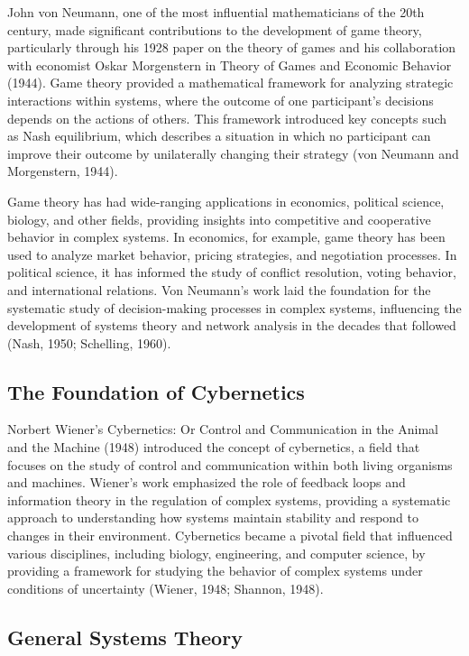 \documentclass[twocolumn]{article}
\begin{document}
\textcolor{primary}{John von Neumann, one of the most influential mathematicians of the 20th century, made significant contributions to the development of game theory, particularly through his 1928 paper on the theory of games and his collaboration with economist Oskar Morgenstern in Theory of Games and Economic Behavior (1944). Game theory provided a mathematical framework for analyzing strategic interactions within systems, where the outcome of one participant’s decisions depends on the actions of others. This framework introduced key concepts such as Nash equilibrium, which describes a situation in which no participant can improve their outcome by unilaterally changing their strategy (von Neumann and Morgenstern, 1944).}

\textcolor{secondary}{Game theory has had wide-ranging applications in economics, political science, biology, and other fields, providing insights into competitive and cooperative behavior in complex systems. In economics, for example, game theory has been used to analyze market behavior, pricing strategies, and negotiation processes. In political science, it has informed the study of conflict resolution, voting behavior, and international relations. Von Neumann’s work laid the foundation for the systematic study of decision-making processes in complex systems, influencing the development of systems theory and network analysis in the decades that followed (Nash, 1950; Schelling, 1960).}

\subsection{The Foundation of Cybernetics}

\textcolor{primary}{Norbert Wiener’s Cybernetics: Or Control and Communication in the Animal and the Machine (1948) introduced the concept of cybernetics, a field that focuses on the study of control and communication within both living organisms and machines. Wiener’s work emphasized the role of feedback loops and information theory in the regulation of complex systems, providing a systematic approach to understanding how systems maintain stability and respond to changes in their environment. Cybernetics became a pivotal field that influenced various disciplines, including biology, engineering, and computer science, by providing a framework for studying the behavior of complex systems under conditions of uncertainty (Wiener, 1948; Shannon, 1948).}

\subsection{General Systems Theory}
\end{document}

